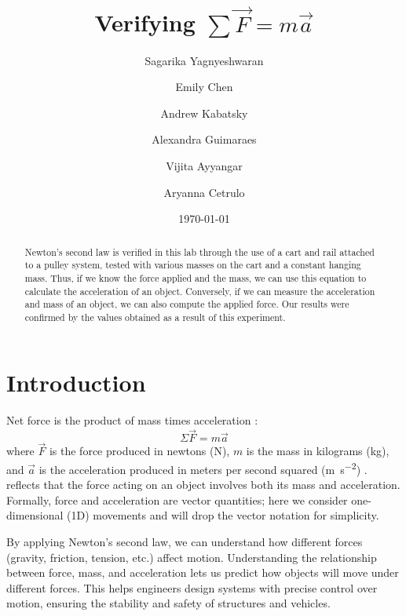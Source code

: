 \documentclass[reprint,amsmath,amssymb.aps]{revtex4-2}
\begin{document}
\title{Verifying $\sum\vec{F} = m\vec{a}$}

\author{Sagarika Yagnyeshwaran}
\author{Emily Chen}
\author{Andrew Kabatsky}
\author{Alexandra Guimaraes}
\author{Vijita Ayyangar}
\author{Aryanna Cetrulo}
\date{\today}

\begin{abstract}
Newton’s second law is verified in this lab through the use of a cart and rail attached to a pulley system, tested with various masses on the cart and a constant hanging mass. Thus, if we know the force applied and the mass, we can use this equation to calculate the acceleration of an object. Conversely, if we can measure the acceleration and mass of an object, we can also compute the applied force. Our results were confirmed by the values obtained as a result of this experiment.
\end{abstract}


\maketitle





\section{Introduction}
Net force is the product of mass times acceleration \cite{newton1687principia}:
\begin{equation} 
\Sigma\vec{F} = m\vec{a}
\label{eq:1}
\end{equation}
where $\vec{F}$ is the force produced in newtons (\unit{\newton}), $m$ is the mass in kilograms (\unit{\kilo\gram}), and $\vec{a}$ is the acceleration produced in meters per second squared (\unit{\meter\per\second\squared}) \cite{newton1687principia}.  reflects that the force acting on an object involves both its mass and acceleration. Formally, force and acceleration are vector quantities; here we consider one-dimensional (1D) movements and will drop the vector notation for simplicity. 

By applying Newton's second law, we can understand how different forces (gravity, friction, tension, etc.) affect motion. Understanding the relationship between force, mass, and acceleration lets us predict how objects will move under different forces. This helps engineers design systems with precise control over motion, ensuring the stability and safety of structures and vehicles.
\end{document}
